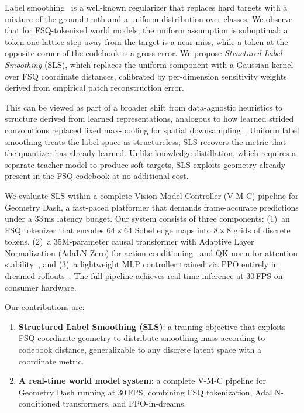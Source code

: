 \documentclass{article}
\newcommand{\gridsize}{8 \times 8}
\newcommand{\imgsize}{64 \times 64}
\newcommand{\nparams}{35\text{M}}
\begin{document}
Label smoothing~\citep{szegedy2016rethinking} is a well-known regularizer that replaces hard targets with a mixture of the ground truth and a uniform distribution over classes.
We observe that for FSQ-tokenized world models, the uniform assumption is suboptimal: a token one lattice step away from the target is a near-miss, while a token at the opposite corner of the codebook is a gross error.
We propose \emph{Structured Label Smoothing} (SLS), which replaces the uniform component with a Gaussian kernel over FSQ coordinate distances, calibrated by per-dimension sensitivity weights derived from empirical patch reconstruction error.

This can be viewed as part of a broader shift from data-agnostic heuristics to structure derived from learned representations, analogous to how learned strided convolutions replaced fixed max-pooling for spatial downsampling~\citep{springenberg2015striving}.
Uniform label smoothing treats the label space as structureless; SLS recovers the metric that the quantizer has already learned.
Unlike knowledge distillation, which requires a separate teacher model to produce soft targets, SLS exploits geometry already present in the FSQ codebook at no additional cost.

We evaluate SLS within a complete Vision-Model-Controller (V-M-C) pipeline for Geometry Dash, a fast-paced platformer that demands frame-accurate predictions under a 33\,ms latency budget.
Our system consists of three components: (1)~an FSQ tokenizer that encodes $\imgsize$ Sobel edge maps into $\gridsize$ grids of discrete tokens, (2)~a $\nparams$-parameter causal transformer with Adaptive Layer Normalization (AdaLN-Zero) for action conditioning~\citep{peebles2023dit} and QK-norm for attention stability~\citep{esser2024sd3}, and (3)~a lightweight MLP controller trained via PPO entirely in dreamed rollouts~\citep{schulman2017ppo}.
The full pipeline achieves real-time inference at 30\,FPS on consumer hardware.

Our contributions are:
\begin{enumerate}
  \item \textbf{Structured Label Smoothing (SLS)}: a training objective that exploits FSQ coordinate geometry to distribute smoothing mass according to codebook distance, generalizable to any discrete latent space with a coordinate metric.
  \item \textbf{A real-time world model system}: a complete V-M-C pipeline for Geometry Dash running at 30\,FPS, combining FSQ tokenization, AdaLN-conditioned transformers, and PPO-in-dreams.
\end{enumerate}
\end{document}
